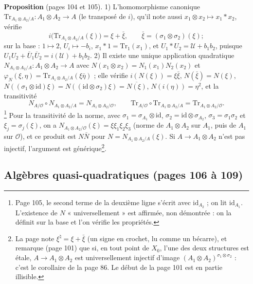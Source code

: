 \documentclass[11pt,a4paper]{article}
\begin{document}
\textbf{Proposition} (pages 104 et 105). 1) L'homomorphisme canonique
$\mathrm{Tr}_{A_1 \otimes A_2/A} : A_1 \otimes A_2 \to A$ (le transposé de $i$), qu'il note
aussi $x_1 \otimes x_2 \mapsto x_1 * x_2$, vérifie
\[
  i\bigl(\mathrm{Tr}_{A_1 \otimes A_2/A}(\xi)\bigr) = \xi + \bar{\xi}, \qquad \bar{\xi} = (\sigma_1 \otimes \sigma_2)(\xi);
\]
sur la base : $1 \mapsto 2$, $U_i \mapsto -b_i$, $x_1 * 1 = \mathrm{Tr}_1(x_1)$, et
$U_1 * U_2 = \mathcal{U} + b_1b_2$, puisque $U_1U_2 + \bar{U}_1\bar{U}_2 = i(\mathcal{U}) + b_1b_2$.
2) Il existe une unique application quadratique $N_{A_1 \otimes A_2/A} : A_1 \otimes A_2 \to
A$ avec $N(x_1 \otimes x_2) = N_1(x_1)N_2(x_2)$ et $\varphi_N(\xi, \eta) =
\mathrm{Tr}_{A_1 \otimes A_2/A}(\xi\bar{\eta})$ ; elle vérifie $i(N(\xi)) = \xi\bar{\xi}$,
$N(\bar{\xi}) = N(\xi)$, $N((\sigma_1 \otimes \mathrm{id})\xi) = N((\mathrm{id} \otimes
\sigma_2)\xi) = \overline{N(\xi)}$, $N(i(\eta)) = \eta^{2}$, et la transitivité
\[
  N_{A/\mathcal{O}} \circ N_{A_1 \otimes A_2/A} = N_{A_1 \otimes A_2/\mathcal{O}}, \qquad
  \mathrm{Tr}_{A/\mathcal{O}} \circ \mathrm{Tr}_{A_1 \otimes A_2/A} = \mathrm{Tr}_{A_1 \otimes A_2/\mathcal{O}}.
\]\footnote{Page
  105, le second terme de la deuxième ligne s'écrit avec $\mathrm{id}_{A_2}$ ; on lit
  $\mathrm{id}_{A_1}$. L'existence de $N$ « universellement » est affirmée, non
  démontrée : on la définit sur la base et l'on vérifie les propriétés.}
Pour la transitivité de la norme, avec $\sigma_1 = \sigma_{A_1} \otimes \mathrm{id}$,
$\sigma_2 = \mathrm{id} \otimes \sigma_{A_2}$, $\sigma_3 = \sigma_1\sigma_2$ et $\xi_j =
\sigma_j(\xi)$, on a $N_{A_1 \otimes A_2/\mathcal{O}}(\xi) = \xi\xi_1\xi_2\xi_3$ (norme de
$A_1 \otimes A_2$ sur $A_1$, puis de $A_1$ sur $\mathcal{O}$), et ce produit est
$N\bar{N}$ pour $N = N_{A_1 \otimes A_2/A}(\xi)$. Si $A \to A_1 \otimes A_2$ n'est pas
injectif, l'argument est générique\footnote{La page note $\xi^{\natural} = \xi + \bar{\xi}$
(un signe en crochet, lu comme un bécarre), et remarque (page 101) que si, en tout
point de $X_0$, l'une des deux structures est étale, $A \to A_1 \otimes A_2$ est
universellement injectif d'image $(A_1 \otimes A_2)^{\sigma_1 \otimes \sigma_2}$ : c'est le
corollaire de la page 86. Le début de la page 101 est en partie illisible.}.

\subsection*{Algèbres quasi-quadratiques (pages 106 à 109)}
\end{document}

